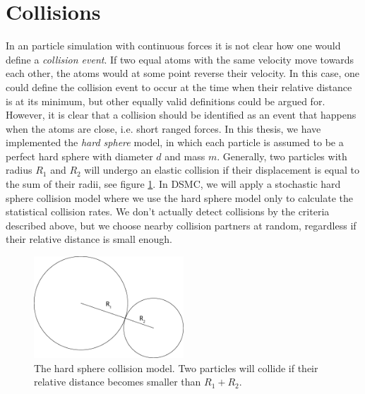 \section{Collisions}
\label{sec:dsmc_collisions_model}
In an particle simulation with continuous forces it is not clear how one would define a \textit{collision event}. If two equal atoms with the same velocity move towards each other, the atoms would at some point reverse their velocity. In this case, one could define the collision event to occur at the time when their relative distance is at its minimum, but other equally valid definitions could be argued for. However, it is clear that a collision should be identified as an event that happens when the atoms are close, i.e. short ranged forces. In this thesis, we have implemented the \textit{hard sphere} model, in which each particle is assumed to be a perfect hard sphere with diameter $d$ and mass $m$. Generally, two particles with radius $R_1$ and $R_2$ will undergo an elastic collision if their displacement is equal to the sum of their radii, see figure \ref{fig:dsmc_hard_sphere}. In DSMC, we will apply a stochastic hard sphere collision model where we use the hard sphere model only to calculate the statistical collision rates. We don't actually detect collisions by the criteria described above, but we choose nearby collision partners at random, regardless if their relative distance is small enough. 
\begin{figure}[h]
\begin{center}
\includegraphics[width=0.5\textwidth, trim=0cm 0cm 0cm 0cm, clip]{DSMC/figures/collisions.eps}
\end{center}
\caption{The hard sphere collision model. Two particles will collide if their relative distance becomes smaller than $R_1+R_2$.}
\label{fig:dsmc_hard_sphere}
\end{figure}
